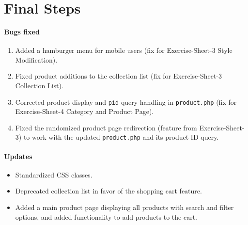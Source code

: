 \section{Final Steps}

\paragraph{Bugs fixed}
\begin{enumerate}
    \item Added a hamburger menu for mobile users (fix for Exercise-Sheet-3 Style Modification).
    \item Fixed product additions to the collection list (fix for Exercise-Sheet-3 Collection List).
    \item Corrected product display and \texttt{pid} query handling in \texttt{product.php} (fix for Exercise-Sheet-4 Category and Product Page).
    \item Fixed the randomized product page redirection (feature from Exercise-Sheet-3) to work with the updated \texttt{product.php} and its product ID query.
\end{enumerate}

\paragraph{Updates}
\begin{itemize}
    \item Standardized CSS classes.
    \item Deprecated collection list in favor of the shopping cart feature.
    \item Added a main product page displaying all products with search and filter options, and added functionality to add products to the cart.
\end{itemize}